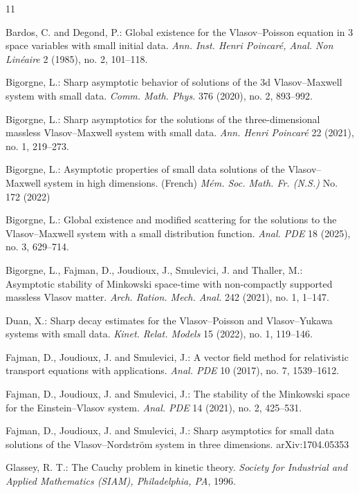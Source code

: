 \documentclass{article}
\begin{document}
\begin{thebibliography}{11}

 Bardos, C. and Degond, P.:
Global existence for the Vlasov--Poisson equation in 3 space variables with small initial
data.
{\it Ann. Inst. Henri Poincar{\' e}, Anal. Non Lin{\' e}aire} 2 (1985), no. 2, 101--118.

 Bigorgne, L.:
Sharp asymptotic behavior of solutions of the 3d Vlasov--Maxwell system with small data.
{\it Comm. Math. Phys.} 376 (2020), no. 2, 893--992.

 Bigorgne, L.:
Sharp asymptotics for the solutions of the three-dimensional massless Vlasov--Maxwell system with small data.
{\it Ann. Henri Poincar{\'e}} 22 (2021), no. 1, 219--273.

 Bigorgne, L.:
Asymptotic properties of small data solutions of the Vlasov--Maxwell system in high dimensions. (French)
{\it M{\' e}m. Soc. Math. Fr. (N.S.)} No. 172 (2022)

 Bigorgne, L.:
Global existence and modified scattering for the solutions to the Vlasov--Maxwell system with a small distribution function.
{\it Anal. PDE} 18 (2025), no. 3, 629--714.

 Bigorgne, L., Fajman, D., Joudioux, J., Smulevici, J. and Thaller, M.:
Asymptotic stability of Minkowski space-time with non-compactly supported massless Vlasov matter.
{\it Arch. Ration. Mech. Anal.} 242 (2021), no. 1, 1--147.

 Duan, X.:
Sharp decay estimates for the Vlasov--Poisson and Vlasov--Yukawa systems with small data.
{\it Kinet. Relat. Models} 15 (2022), no. 1, 119--146.

 Fajman, D., Joudioux, J. and Smulevici, J.:
A vector field method for relativistic transport equations with applications.
{\it Anal. PDE} 10 (2017), no. 7, 1539--1612.

 Fajman, D., Joudioux, J. and Smulevici, J.:
The stability of the Minkowski space for the Einstein--Vlasov system.
{\it Anal. PDE} 14 (2021), no. 2, 425--531.

 Fajman, D., Joudioux, J. and Smulevici, J.:
Sharp asymptotics for small data solutions of the Vlasov--Nordstr{\"o}m system in three dimensions.
arXiv:1704.05353

 Glassey, R. T.:
The Cauchy problem in kinetic theory.
{\it Society for Industrial and Applied Mathematics (SIAM), Philadelphia, PA}, 1996.


\end{thebibliography}
\end{document}
